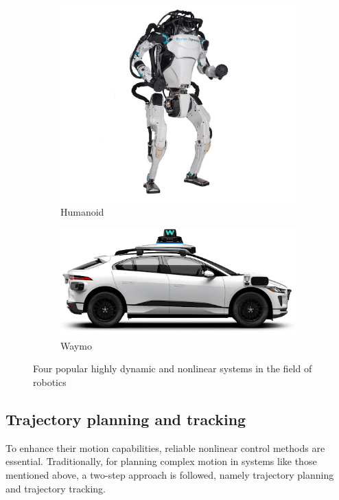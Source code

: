 \begin{figure}[H]
    \begin{subfigure}[b]{0.45\textwidth}
        \includegraphics[width=\textwidth]{figures/humanoid.jpg}
        \caption{Humanoid}
        \label{fig:image3}
    \end{subfigure}
    \hfill
    \begin{subfigure}[b]{0.45\textwidth}
        \includegraphics[width=\textwidth]{figures/waymo.png}
        \caption{Waymo}
        \label{fig:image4}
    \end{subfigure}
    \caption{Four popular highly dynamic and nonlinear systems in the field of robotics}
    \label{fig:four_images}
\end{figure}

\subsection{Trajectory planning and tracking}
To enhance their motion capabilities, reliable nonlinear control methods are essential. Traditionally, for planning complex motion in systems like those mentioned above, a two-step approach is followed, namely trajectory planning and trajectory tracking.

